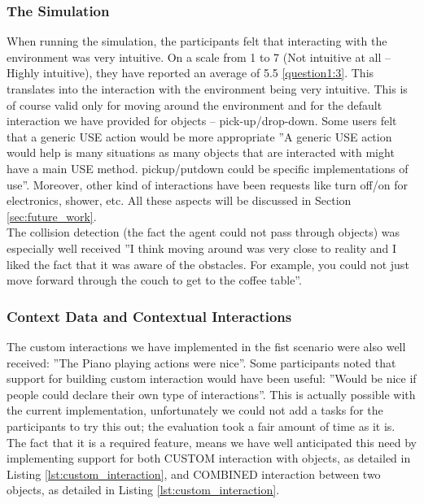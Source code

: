 \subsubsection{The Simulation} %
When running the simulation, the participants felt that interacting with the environment was very intuitive. On a scale from 1 to 7 (Not intuitive at all -- Highly intuitive), they have reported an average of 5.5 \ref{question1:3}. This translates into the interaction with the environment being very intuitive. This is of course valid only for moving around the environment and for the default interaction we have provided for objects -- pick-up/drop-down. Some users felt that a generic USE action would be more appropriate ''A generic USE action would help is many situations as many objects that are interacted with might have a main USE method. pickup/putdown could be specific implementations of use''. Moreover, other kind of interactions have been requests like turn off/on for electronics, shower, etc. All these aspects will be discussed in Section \ref{sec:future_work}.\\

The collision detection (the fact the agent could not pass through objects) was especially well received ''I think moving around was very close to reality and I liked the fact that it was aware of the obstacles. For example, you could not just move forward through the couch to get to the coffee table''.\\

\subsubsection{Context Data and Contextual Interactions} %
The custom interactions we have implemented in the fist scenario were also well received: ''The Piano playing actions were nice''. Some participants noted that support for building custom interaction would have been useful: ''Would be nice if people could declare their own type of interactions''. This is actually possible with the current implementation, unfortunately we could not add a tasks for the participants to try this out; the evaluation took a fair amount of time as it is. The fact that it is a required feature, means we have well anticipated this need by implementing support for both CUSTOM interaction with objects, as detailed in Listing \ref{lst:custom_interaction}, and COMBINED interaction between two objects, as detailed in Listing \ref{lst:custom_interaction}.\\

